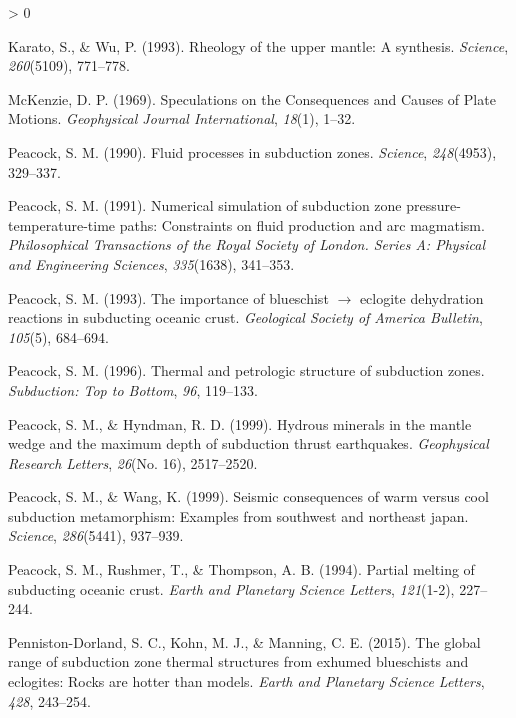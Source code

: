 \documentclass[draft,linenumbers]{agujournal2018}
\newlength{\cslhangindent}
\newenvironment{CSLReferences}[2] %
 {%
  \setlength{\parindent}{0pt}
  \ifodd #1 \everypar{\setlength{\hangindent}{\cslhangindent}}\ignorespaces\fi
  \ifnum #2 > 0
  \setlength{\parskip}{#2\baselineskip}
  \fi
 }%
 {}
\begin{document}
\begin{CSLReferences}{1}{0}
\leavevmode{}%
Karato, S., \& Wu, P. (1993). Rheology of the upper mantle: A synthesis.
\emph{Science}, \emph{260}(5109), 771--778.

\leavevmode{}%
McKenzie, D. P. (1969). {Speculations on the Consequences and Causes of
Plate Motions}. \emph{Geophysical Journal International}, \emph{18}(1),
1--32.

\leavevmode{}%
Peacock, S. M. (1990). Fluid processes in subduction zones.
\emph{Science}, \emph{248}(4953), 329--337.

\leavevmode{}%
Peacock, S. M. (1991). Numerical simulation of subduction zone
pressure-temperature-time paths: Constraints on fluid production and arc
magmatism. \emph{Philosophical Transactions of the Royal Society of
London. Series A: Physical and Engineering Sciences}, \emph{335}(1638),
341--353.

\leavevmode{}%
Peacock, S. M. (1993). The importance of blueschist \(\rightarrow\)
eclogite dehydration reactions in subducting oceanic crust.
\emph{Geological Society of America Bulletin}, \emph{105}(5), 684--694.

\leavevmode{}%
Peacock, S. M. (1996). Thermal and petrologic structure of subduction
zones. \emph{Subduction: Top to Bottom}, \emph{96}, 119--133.

\leavevmode{}%
Peacock, S. M., \& Hyndman, R. D. (1999). {Hydrous minerals in the
mantle wedge and the maximum depth of subduction thrust earthquakes}.
\emph{Geophysical Research Letters}, \emph{26}(No. 16), 2517--2520.

\leavevmode{}%
Peacock, S. M., \& Wang, K. (1999). Seismic consequences of warm versus
cool subduction metamorphism: Examples from southwest and northeast
japan. \emph{Science}, \emph{286}(5441), 937--939.

\leavevmode{}%
Peacock, S. M., Rushmer, T., \& Thompson, A. B. (1994). Partial melting
of subducting oceanic crust. \emph{Earth and Planetary Science Letters},
\emph{121}(1-2), 227--244.

\leavevmode{}%
Penniston-Dorland, S. C., Kohn, M. J., \& Manning, C. E. (2015). The
global range of subduction zone thermal structures from exhumed
blueschists and eclogites: Rocks are hotter than models. \emph{Earth and
Planetary Science Letters}, \emph{428}, 243--254.


\end{CSLReferences}
\end{document}
